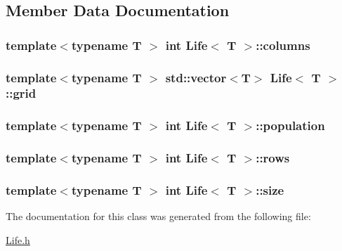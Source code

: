 \subsection{Member Data Documentation}
\hypertarget{classLife_a65d1a622f32424e9c0a10c7cc051ea58}{
\subsubsection[{columns}]{\setlength{\rightskip}{0pt plus 5cm}template$<$typename T $>$ int {\bf Life}$<$ T $>$\-::columns\hspace{0.3cm}{\ttfamily [private]}}}\label{classLife_a65d1a622f32424e9c0a10c7cc051ea58}
\hypertarget{classLife_a7ecaf21e43796adda4c080cbb33b5198}{
\subsubsection[{grid}]{\setlength{\rightskip}{0pt plus 5cm}template$<$typename T $>$ std\-::vector$<$T$>$ {\bf Life}$<$ T $>$\-::grid\hspace{0.3cm}{\ttfamily [private]}}}\label{classLife_a7ecaf21e43796adda4c080cbb33b5198}
\hypertarget{classLife_ad0c82e4ef83bc0b56faf58f28e63e1e2}{
\subsubsection[{population}]{\setlength{\rightskip}{0pt plus 5cm}template$<$typename T $>$ int {\bf Life}$<$ T $>$\-::population\hspace{0.3cm}{\ttfamily [private]}}}\label{classLife_ad0c82e4ef83bc0b56faf58f28e63e1e2}
\hypertarget{classLife_ac8b1792a10629f1bfd890ac3acb37510}{
\subsubsection[{rows}]{\setlength{\rightskip}{0pt plus 5cm}template$<$typename T $>$ int {\bf Life}$<$ T $>$\-::rows\hspace{0.3cm}{\ttfamily [private]}}}\label{classLife_ac8b1792a10629f1bfd890ac3acb37510}
\hypertarget{classLife_a53df763a5b9eae675fd8e4d3045bf1ad}{
\subsubsection[{size}]{\setlength{\rightskip}{0pt plus 5cm}template$<$typename T $>$ int {\bf Life}$<$ T $>$\-::size\hspace{0.3cm}{\ttfamily [private]}}}\label{classLife_a53df763a5b9eae675fd8e4d3045bf1ad}


The documentation for this class was generated from the following file\-:\begin{DoxyCompactItemize}
\item 
\hyperlink{Life_8h}{Life.\-h}\end{DoxyCompactItemize}

